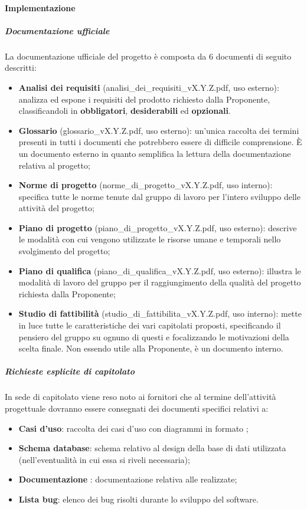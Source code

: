 		\paragraph{Implementazione}
            \subparagraph{Documentazione ufficiale}
    		La documentazione ufficiale del progetto è composta da 6 documenti di seguito descritti:
    		\begin{itemize}
    			\item \textbf{Analisi dei requisiti} (analisi\_dei\_requisiti\_vX.Y.Z.pdf, uso esterno): analizza ed espone i requisiti del prodotto richiesto dalla Proponente, classificandoli in \textbf{obbligatori}, \textbf{desiderabili} ed \textbf{opzionali}.
    			\item \textbf{Glossario} (glossario\_vX.Y.Z.pdf, uso esterno): un'unica raccolta dei termini presenti in tutti i documenti che potrebbero essere di difficile comprensione. È un documento esterno in quanto semplifica la lettura della documentazione relativa al progetto;
    			\item \textbf{Norme di progetto} (norme\_di\_progetto\_vX.Y.Z.pdf, uso interno): specifica tutte le norme tenute dal gruppo di lavoro per l'intero sviluppo delle attività del progetto;
    			\item \textbf{Piano di progetto} (piano\_di\_progetto\_vX.Y.Z.pdf, uso esterno): descrive le modalità con cui vengono utilizzate le risorse umane e temporali nello svolgimento del progetto;
    			\item \textbf{Piano di qualifica} (piano\_di\_qualifica\_vX.Y.Z.pdf, uso esterno): illustra le modalità di lavoro del gruppo per il raggiungimento della qualità del progetto richiesta dalla Proponente;
    			\item \textbf{Studio di fattibilità} (studio\_di\_fattibilita\_vX.Y.Z.pdf, uso interno): mette in luce tutte le caratteristiche dei vari capitolati proposti, specificando il pensiero del gruppo su ognuno di questi e focalizzando le motivazioni della scelta finale. Non essendo utile alla Proponente, è un documento interno.
    		\end{itemize}

            \subparagraph{Richieste esplicite di capitolato}
            In sede di capitolato viene reso noto ai fornitori che al termine dell'attività progettuale dovranno essere consegnati dei documenti specifici relativi a:
            \begin{itemize}
                \item \textbf{Casi d'uso}: raccolta dei casi d'uso con diagrammi in formato ;
                \item \textbf{Schema database}: schema relativo al design della base di dati utilizzata (nell'eventualità in cui essa si riveli necessaria);
                \item \textbf{Documentazione }: documentazione relativa alle  realizzate;
                \item \textbf{Lista bug}: elenco dei bug risolti durante lo sviluppo del software.
            \end{itemize}

